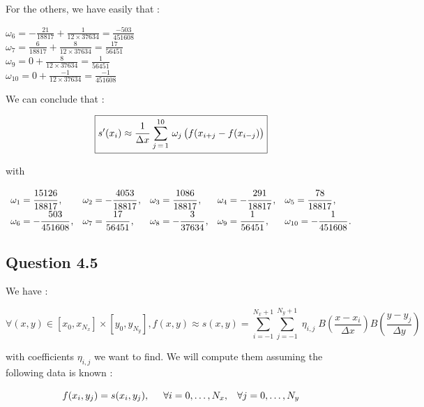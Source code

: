 \documentclass[10pt]{article}
\begin{document}
For the others, we have easily that :

\begin{flushleft}
$\omega_6 = -\frac{21}{18817} + \frac{1}{12 \times 37634} = \frac{-503}{451608}$\\
$\omega_7 = \frac{6}{18817} + \frac{8}{12 \times 37634} = \frac{17}{56451}$\\
$\omega_9 = 0 + \frac{8}{12 \times 37634} = \frac{1}{56451}$\\
$\omega_{10} = 0 + \frac{-1}{12 \times 37634} = \frac{-1}{451608}$
\end{flushleft}

We can conclude that : 

$$\boxed{s'(x_{i}) \approx \cfrac{1}{\Delta x}\, \sum_{j\,=\,1}^{10} \, \omega_{j}\,\big(f(x_{i+j}-f(x_{i-j})\big)}$$


with

\begin{align*}
\begin{array}{lllll}
\omega_{1} = \cfrac{15126}{18817} \, , & \omega_{2} = -\cfrac{4053}{18817} \, , & \omega_{3} = \cfrac{1086}{18817} \, , & \omega_{4} = -\cfrac{291}{18817} \, , & \omega_{5} = \cfrac{78}{18817} \, , \\
\omega_{6} = -\cfrac{503}{451608} \, , & \omega_{7} = \cfrac{17}{56451} \, , & \omega_{8} = -\cfrac{3}{37634} \, , & \omega_{9} = \cfrac{1}{56451} \, , & \omega_{10} = -\cfrac{1}{451608} \, .
\end{array}
\end{align*}


\subsection{Question 4.5}


We have :

$$ \forall (x,y) \in [x_0,x_{N_x}] \times [y_0, y_{N_y}],  f(x,y) \approx s(x,y) = \sum_{i=-1}^{N_x+1}  \sum_{j=-1}^{N_y+1} \; \eta_{i,j} \; B(\frac{x-x_i}{\Delta x}) B(\frac{y-y_j}{\Delta y}) $$

with coefficients $\eta_{i,j}$ we want to find. We will compute them assuming the following data is known :

$$ f(x_i,y_j) = s(x_i,y_j), \hspace{5 mm} \forall i = 0,\dots,N_x, \hspace{3 mm} \forall j = 0,\dots,N_y$$
\end{document}
